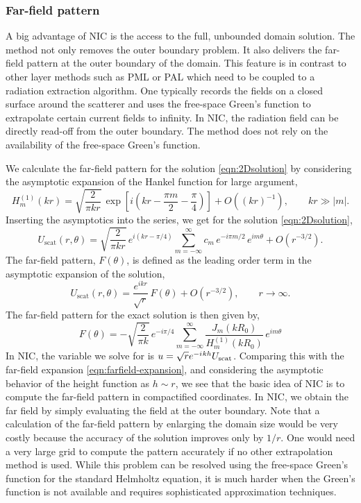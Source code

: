 \documentclass[onefignum,onetabnum]{siamart190516}
\newcommand{\iu}{{i\mkern1mu}}
\begin{document}
\subsubsection{Far-field pattern}
A big advantage of NIC is the access to the full, unbounded domain solution. The method not only removes the outer boundary problem. It also delivers the far-field pattern at the outer boundary of the domain. This feature is in contrast to other layer methods such as PML or PAL which need to be coupled to a radiation extraction algorithm. One typically records the fields on a closed surface around the scatterer and uses the free-space Green's function to extrapolate certain current fields to infinity. In NIC, the radiation field can be directly read-off from the outer boundary. The method does not rely on the availability of the free-space Green's function. 

We calculate the far-field pattern for the solution \eqref{eqn:2Dsolution} by considering the asymptotic expansion of the Hankel function for large argument, 
\[
H_m^{(1)}(kr)
  =\sqrt{\frac{2}{\pi kr}}\,
    \exp\!\left[i\left(kr-\frac{\pi m}{2}-\frac{\pi}{4}\right)\right]
    +O\!\left((kr)^{-1}\right),
  \qquad kr\gg|m| .
\]
Inserting the asymptotics into the series, we get for the solution \eqref{eqn:2Dsolution},
\[
U_{\mathrm{scat}}(r,\theta) =
  \sqrt{\frac{2}{\pi kr}}\,
  e^{i(kr-\pi/4)}
  \sum_{m=-\infty}^{\infty}
      c_m\,e^{-i\pi m/2}\,e^{im\theta}
  +O(r^{-3/2}).
\]
The far-field pattern, $F(\theta)$, is defined as the leading order term in the asymptotic expansion of the solution, 
\begin{equation}\label{eqn:farfield-expansion}
U_{\mathrm{scat}}(r,\theta)
  =\frac{e^{ikr}}{\sqrt{r}}\,
   F(\theta)+O(r^{-3/2}),
  \qquad r\to\infty .
\end{equation}
The far-field pattern for the exact solution is then given by,
\[
F(\theta)
  =-\sqrt{\frac{2}{\pi k}}\,
    e^{-i\pi/4}
    \sum_{m=-\infty}^{\infty}
      \frac{J_m(kR_0)}{H_m^{(1)}(kR_0)}\,
      e^{im\theta}
\]
In NIC, the variable we solve for is $u = \sqrt{r} e^{-\iu k h} U_{\mathrm{scat}}$. Comparing this with the far-field expansion \eqref{eqn:farfield-expansion}, and considering the asymptotic behavior of the height function as $h\sim r$, we see that the basic idea of NIC is to compute the far-field pattern in compactified coordinates. In NIC, we obtain the far field by simply evaluating the field at the outer boundary. Note that a calculation of the far-field pattern by enlarging the domain size would be very costly because the accuracy of the solution improves only by $1/r$. One would need a very large grid to compute the pattern accurately if no other extrapolation method is used. While this problem can be resolved using the free-space Green's function for the standard Helmholtz equation, it is much harder when the Green's function is not available and requires sophisticated approximation techniques. 
\end{document}
